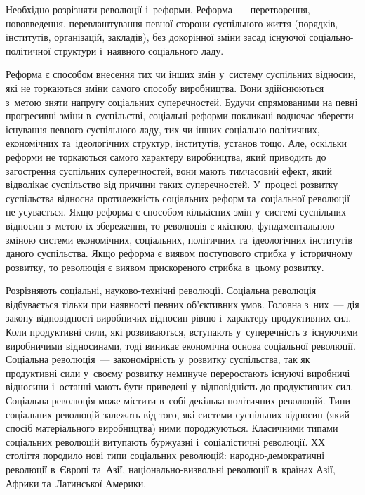 \documentclass[a5paper,oneside,DIV=12,12pt,headings=small]{scrartcl}
\begin{document}
		Необхідно розрізняти революції і~реформи. Реформа~— перетворення, нововведення, перевлаштування певної сторони суспільного життя (порядків, інститутів, організацій, закладів), без докорінної зміни засад існуючої соціально-політичної структури і~наявного соціального ладу. 
		
		Реформа є способом внесення тих чи інших змін у~систему суспільних відносин, які не торкаються зміни самого способу виробництва. Вони здійснюються з~метою зняти напругу соціальних суперечностей. Будучи спрямованими на певні прогресивні зміни в~суспільстві, соціальні реформи покликані водночас зберегти існування певного суспільного ладу, тих чи інших соціально-політичних, економічних та~ідеологічних структур, інститутів, установ тощо. Але, оскільки реформи не торкаються самого характеру виробництва, який приводить до загострення суспільних суперечностей, вони мають тимчасовий ефект, який відволікає суспільство від причини таких суперечностей. У~процесі розвитку суспільства відносна протилежність соціальних реформ та~соціальної революції не усувається. Якщо реформа є способом кількісних змін у~системі суспільних відносин з~метою їх збереження, то революція є якісною, фундаментальною зміною системи економічних, соціальних, політичних та~ідеологічних інститутів даного суспільства. Якщо реформа є виявом поступового стрибка у~історичному розвитку, то революція є виявом прискореного стрибка в~цьому розвитку.
		
		Розрізняють соціальні, науково-технічні революції. Соціальна революція відбувається тільки при наявності певних об'\-єк\-тив\-них умов. Головна з~них~— дія закону відповідності виробничих відносин рівню і~характеру продуктивних сил. Коли продуктивні сили, які розвиваються, вступають у~суперечність з~існуючими виробничими відносинами, тоді виникає економічна основа соціальної революції. Соціальна революція~— закономірність у~розвитку суспільства, так як продуктивні сили у~своєму розвитку неминуче переростають існуючі виробничі відносини і~останні мають бути приведені у~відповідність до продуктивних сил. Соціальна революція може містити в~собі декілька політичних революцій. Типи соціальних революцій залежать від того, які системи суспільних відносин (який спосіб матеріального виробництва) ними породжуються. Класичними типами соціальних революцій витупають буржуазні і~соціалістичні революції. ХХ століття породило нові типи соціальних революцій: народно-демократичні революції в~Європі та~Азії, національно-визвольні революції в~країнах Азії, Африки та~Латинської Америки.
		
\end{document}
